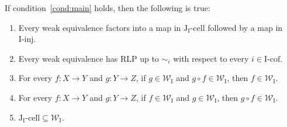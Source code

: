 \documentclass{tac}
\theoremstyle{definition}
\newcommand{\we}{\mathcal{W}}
\newcommand{\I}{\mathrm{I}}
\newcommand{\J}{\mathrm{J}}
\newcommand{\class}[2]{#1\text{-}\mathrm{#2}}
\newcommand{\Iinj}[1][\I]{\class{#1}{inj}}
\newcommand{\Icell}[1][\I]{\class{#1}{cell}}
\newcommand{\Icof}[1][\I]{\class{#1}{cof}}
\newcommand{\Jcell}[1][]{\Icell[\J#1]}
\begin{document}
\begin{lem}[main]
If condition~\eqref{cond:main} holds, then the following is true:
\begin{enumerate}
\item Every weak equivalence factors into a map in $\Jcell[_\I]$ followed by a map in $\Iinj$.
\item Every weak equivalence has RLP up to $\sim_i$ with respect to every $i \in \Icof$.
\item \label{it:we-top} For every $f : X \to Y$ and $g : Y \to Z$, if $g \in \we_\I$ and $g \circ f \in \we_\I$, then $f \in \we_\I$.
\item For every $f : X \to Y$ and $g : Y \to Z$, if $f \in \we_\I$ and $g \in \we_\I$, then $g \circ f \in \we_\I$.
\item $\Jcell[_\I] \subseteq \we_\I$.
\end{enumerate}
\end{lem}
\end{document}
